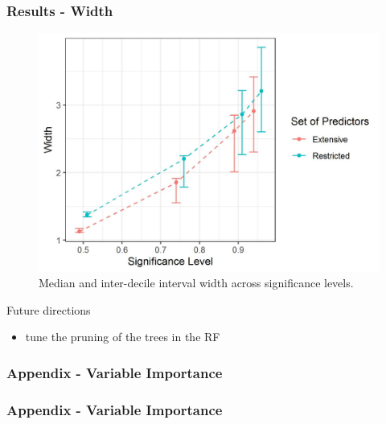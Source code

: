 \documentclass{beamer}
\begin{document}
\begin{frame} \frametitle{Results - Width}   
\begin{figure}
	\centering
	\includegraphics[scale = 0.5]{conformal.jpeg}
	\caption{Median and inter-decile interval width across significance levels.}
	\label{fig:conformal}
\end{figure}
\end{frame}

\begin{frame}
Future directions
\begin{itemize}
	\item tune the pruning of the trees in the RF
\end{itemize}
\end{frame}

\begin{frame} \frametitle{Appendix - Variable Importance}    

\end{frame}


\begin{frame} \frametitle{Appendix - Variable Importance}    

\end{frame}
\end{document}
